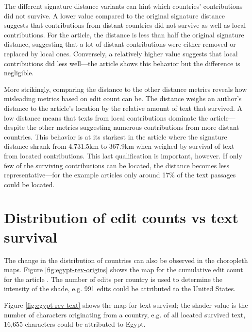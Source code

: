 The different signature distance variants can hint which countries' contributions did not survive.
A lower  value compared to the original signature distance suggests that contributions from distant countries did not survive as well as local contributions.
For the  article, the  distance is less than half the original signature distance, suggesting that a lot of distant contributions were either removed or replaced by local ones.
Conversely, a relatively higher  value suggests that local contributions did less well---the article  shows this behavior but the difference is negligible.

More strikingly, comparing the  distance to the other distance metrics reveals how misleading metrics based on edit count can be.
The  distance weighs an author's distance to the article's location by the relative amount of text that survived.
A low  distance means that texts from local contributions dominate the article---despite the other metrics suggesting numerous contributions from more distant countries.
This behavior is at its starkest in the  article where the signature distance shrank from 4,731.5km to 367.9km when weighed by survival of text from located contributions. 
This last qualification is important, however.
If only few of the surviving contributions can be located, the  distance becomes less representative---for the example articles only around 17\% of the text passages could be located.


\section{Distribution of edit counts vs text survival}

The change in the distribution of countries can also be observed in the choropleth maps. 
Figure \ref{fig:egypt-rev-origins} shows the map for the cumulative edit count for the article .
The number of edits per country is used to determine the intensity of the shade, e.g. 991 edits could be attributed to the United States. 

Figure \ref{fig:egypt-rev-text} shows the map for text survival; the shader value is the number of characters originating from a country, e.g. of all located survived text, 16,655 characters could be attributed to Egypt.

